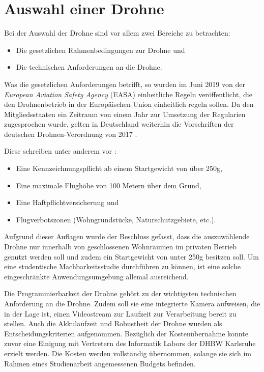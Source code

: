 \section{Auswahl einer Drohne}
\label{drone_selection}

Bei der Auswahl der Drohne sind vor allem zwei Bereiche zu betrachten:

\begin{itemize}
	\item Die gesetzlichen Rahmenbedingungen zur Drohne und
	\item Die technischen Anforderungen an die Drohne.
\end{itemize}

Was die gesetzlichen Anforderungen betrifft, so wurden im Juni 2019 von der \textit{European Aviation Safety Agency} (EASA) einheitliche Regeln veröffentlicht, die den Drohnenbetrieb in der Europäischen Union einheitlich regeln sollen. Da den Mitgliedsstaaten ein Zeitraum von einem Jahr zur Umsetzung der Regularien zugesprochen wurde, gelten in Deutschland weiterhin die Vorschriften der deutschen Drohnen-Verordnung von 2017 \cite{EASA.2019}.

Diese schreiben unter anderem vor \cite{Drohnen.de.2020}:
\begin{itemize}
	\item Eine Kennzeichnungspflicht ab einem Startgewicht von über 250g,
	\item Eine maximale Flughöhe von 100 Metern über dem Grund,
	\item Eine Haftpflichtversicherung und
	\item Flugverbotszonen (Wohngrundstücke, Naturschutzgebiete, etc.).
\end{itemize}

Aufgrund dieser Auflagen wurde der Beschluss gefasst, dass die auszuwählende Drohne nur innerhalb von geschlossenen Wohnräumen im privaten Betrieb genutzt werden soll und zudem ein Startgewicht von unter 250g besitzen soll. Um eine studentische Machbarkeitsstudie durchführen zu können, ist eine solche eingeschränkte Anwendungsumgebung allemal ausreichend. 

Die Programmierbarkeit der Drohne gehört zu der wichtigsten technischen Anforderung an die Drohne. Zudem soll sie eine integrierte Kamera aufweisen, die in der Lage ist, einen Videostream zur Laufzeit zur Verarbeitung bereit zu stellen. Auch die Akkulaufzeit und Robustheit der Drohne wurden als Entscheidungskriterien aufgenommen. Bezüglich der Kostenübernahme konnte zuvor eine Einigung mit Vertretern des Informatik Labors der DHBW Karlsruhe erzielt werden. Die Kosten werden vollständig übernommen, solange sie sich im Rahmen eines Studienarbeit angemessenen Budgets befinden.

